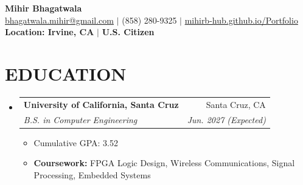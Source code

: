 \documentclass[letterpaper,11pt]{article}
\makeatletter
\newcommand{\resumeItem}[1]{
  \item\small{
    {#1 \vspace{-2pt}}
  }
}
\newcommand{\resumeSubheading}[4]{
  \vspace{-2pt}\item
    \begin{tabular*}{0.97\textwidth}[t]{l@{\extracolsep{\fill}}r}
      \textbf{#1} & #2 \\
      \textit{\small#3} & \textit{\small #4} \\
    \end{tabular*}\vspace{-7pt}
}
\newcommand{\resumeSubHeadingListStart}{\begin{itemize}[leftmargin=0.15in, label={}]}
\newcommand{\resumeSubHeadingListEnd}{\end{itemize}}
\newcommand{\resumeItemListStart}{\begin{itemize}}
\newcommand{\resumeItemListEnd}{\end{itemize}\vspace{-5pt}}
\makeatother
\begin{document}

\begin{center}
    \textbf{\Huge Mihir Bhagatwala} \\ \vspace{5pt}
    \small \href{mailto:bhagatwala.mihir@gmail.com}{bhagatwala.mihir@gmail.com} $|$ (858) 280-9325 $|$ \href{https://mihirb-hub.github.io/Portfolio/}{mihirb-hub.github.io/Portfolio} \\ \vspace{2pt}
    \textbf{Location: Irvine, CA} $|$ \textbf{U.S. Citizen}
\end{center}


\section{EDUCATION}
  \resumeSubHeadingListStart
    \resumeSubheading
      {University of California, Santa Cruz}{Santa Cruz, CA}
      {B.S. in Computer Engineering}{Jun. 2027 (Expected)}
      \resumeItemListStart
        \resumeItem{Cumulative GPA: 3.52}
        \resumeItem{\textbf{Coursework:} FPGA Logic Design, Wireless Communications, Signal Processing, Embedded Systems}
      \resumeItemListEnd
  \resumeSubHeadingListEnd


\end{document}
